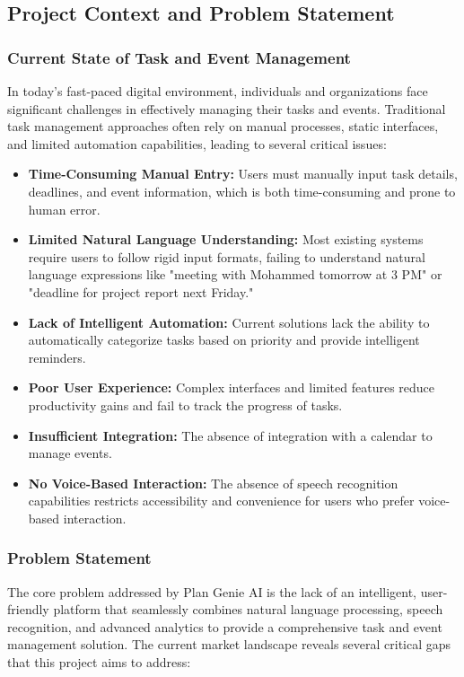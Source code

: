 \documentclass[12pt,a4paper]{article}
\begin{document}
\subsection{Project Context and Problem Statement}

\subsubsection{Current State of Task and Event Management}

In today's fast-paced digital environment, individuals and organizations face significant challenges in effectively managing their tasks and events. Traditional task management approaches often rely on manual processes, static interfaces, and limited automation capabilities, leading to several critical issues:

\begin{itemize}
    \item \textbf{Time-Consuming Manual Entry:} Users must manually input task details, deadlines, and event information, which is both time-consuming and prone to human error.
    \item \textbf{Limited Natural Language Understanding:} Most existing systems require users to follow rigid input formats, failing to understand natural language expressions like "meeting with Mohammed tomorrow at 3 PM" or "deadline for project report next Friday."
    \item \textbf{Lack of Intelligent Automation:} Current solutions lack the ability to automatically categorize tasks based on priority and provide intelligent reminders.
    \item \textbf{Poor User Experience:} Complex interfaces and limited features reduce productivity gains and fail to track the progress of tasks.
    \item \textbf{Insufficient Integration:} The absence of integration with a calendar to manage events.
    \item \textbf{No Voice-Based Interaction:} The absence of speech recognition capabilities restricts accessibility and convenience for users who prefer voice-based interaction.
\end{itemize}

\subsubsection{Problem Statement}

The core problem addressed by Plan Genie AI is the lack of an intelligent, user-friendly platform that seamlessly combines natural language processing, speech recognition, and advanced analytics to provide a comprehensive task and event management solution. The current market landscape reveals several critical gaps that this project aims to address:
\end{document}
